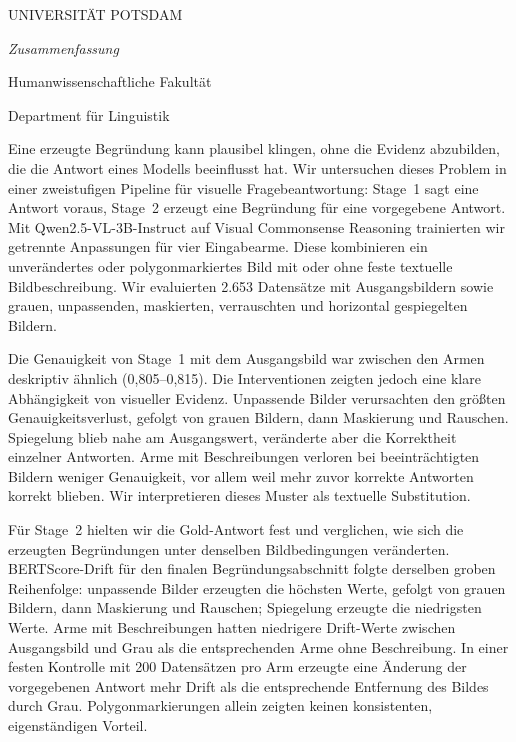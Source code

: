 \documentclass[
12pt,
oneside,
english,
onehalfspacing,
nolistspacing,
parskip,
headsepline,
]{MastersDoctoralThesis}
\begin{document}
\clearpage

{}
\begin{center}
{\normalsize \MakeUppercase{Universität Potsdam} \par}
{\LARGE\textit{Zusammenfassung} \par}
{\normalsize Humanwissenschaftliche Fakultät \par}
{\normalsize Department für Linguistik \par}
{\normalsize \degreename\par}
{\normalsize\bfseries \ttitle \par}
{\normalsize \byname{} \authorname \par}
\smallskip
\end{center}
{
\begin{singlespace}
\footnotesize
\setlength{\parskip}{0.1em}
\noindent Eine erzeugte Begründung kann plausibel klingen, ohne die Evidenz
abzubilden, die die Antwort eines Modells beeinflusst hat. Wir untersuchen
dieses Problem in einer zweistufigen Pipeline für visuelle Fragebeantwortung:
Stage~1 sagt eine Antwort voraus, Stage~2 erzeugt eine Begründung für eine
vorgegebene Antwort. Mit Qwen2.5-VL-3B-Instruct auf Visual Commonsense
Reasoning trainierten wir getrennte Anpassungen für vier Eingabearme. Diese
kombinieren ein unverändertes oder polygonmarkiertes Bild mit oder ohne feste
textuelle Bildbeschreibung. Wir evaluierten 2.653 Datensätze mit
Ausgangsbildern sowie grauen, unpassenden, maskierten, verrauschten und
horizontal gespiegelten Bildern.

Die Genauigkeit von Stage~1 mit dem Ausgangsbild war zwischen den Armen
deskriptiv ähnlich (0,805--0,815). Die Interventionen zeigten jedoch eine klare
Abhängigkeit von visueller Evidenz. Unpassende Bilder verursachten den größten
Genauigkeitsverlust, gefolgt von grauen Bildern, dann Maskierung und Rauschen.
Spiegelung blieb nahe am Ausgangswert, veränderte aber die Korrektheit einzelner
Antworten. Arme mit Beschreibungen verloren bei beeinträchtigten Bildern
weniger Genauigkeit, vor allem weil mehr zuvor korrekte Antworten korrekt
blieben. Wir interpretieren dieses Muster als textuelle Substitution.

Für Stage~2 hielten wir die Gold-Antwort fest und verglichen, wie sich die
erzeugten Begründungen unter denselben Bildbedingungen veränderten. BERTScore-Drift für den finalen
Begründungsabschnitt folgte derselben groben Reihenfolge: unpassende Bilder
erzeugten die höchsten Werte, gefolgt von grauen Bildern, dann Maskierung und
Rauschen; Spiegelung erzeugte die niedrigsten Werte. Arme mit Beschreibungen
hatten niedrigere Drift-Werte zwischen Ausgangsbild und Grau als die
entsprechenden Arme ohne Beschreibung.
In einer festen Kontrolle mit 200 Datensätzen pro Arm erzeugte eine Änderung
der vorgegebenen Antwort mehr Drift als die entsprechende Entfernung des Bildes
durch Grau. Polygonmarkierungen allein zeigten keinen konsistenten,
eigenständigen Vorteil.


\end{singlespace}}
\end{document}
